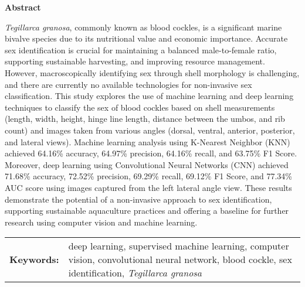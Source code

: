 \begin{center}
	\textbf{Abstract}
\end{center}
\setlength{\parindent}{0pt}
\textit{Tegillarca granosa}, commonly known as blood cockles, is a significant marine bivalve species due to its nutritional value and economic importance. Accurate sex identification is crucial for maintaining a balanced male-to-female ratio, supporting sustainable harvesting, and improving resource management. However, macroscopically identifying sex through shell morphology is challenging, and there are currently no available technologies for non-invasive sex classification. This study explores the use of machine learning and deep learning techniques to classify the sex of blood cockles based on shell measurements (length, width, height, hinge line length, distance between the umbos, and rib count) and images taken from various angles (dorsal, ventral, anterior, posterior, and lateral views). Machine learning analysis using K-Nearest Neighbor (KNN) achieved 64.16\% accuracy, 64.97\% precision, 64.16\% recall, and 63.75\% F1 Score. Moreover, deep learning using Convolutional Neural Networks (CNN) achieved 71.68\% accuracy, 72.52\% precision, 69.29\% recall, 69.12\% F1 Score, and 77.34\% AUC score using images captured from the left lateral angle view. These results demonstrate the potential of a non-invasive approach to sex identification, supporting sustainable aquaculture practices and offering a baseline for further research using computer vision and machine learning.

\begin{tabular}{lp{4.25in}}
	\hspace{-0.5em}\textbf{Keywords:}\hspace{0.25em} & deep learning, supervised machine learning, computer vision, convolutional neural network, blood cockle, sex identification, \textit{Tegillarca granosa}\\
\end{tabular}
